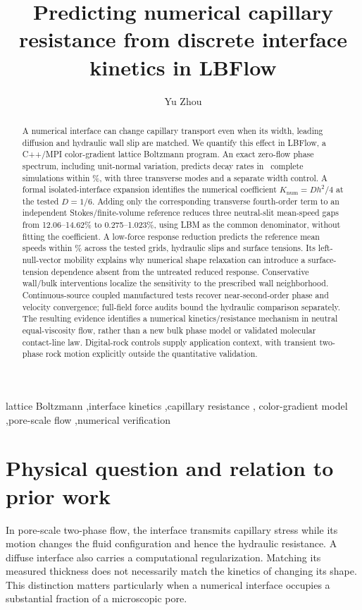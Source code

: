 \documentclass[preprint,12pt]{elsarticle}
\begin{document}
\begin{frontmatter}
\title{Predicting numerical capillary resistance from discrete interface kinetics in LBFlow}
\author{Yu Zhou}
\address{Independent Researcher, Canada}
\begin{abstract}
A numerical interface can change capillary transport even when its width,
leading diffusion and hydraulic wall slip are matched. We quantify this
effect in LBFlow, a C++/MPI color-gradient lattice Boltzmann program.
An exact zero-flow phase spectrum, including unit-normal variation, predicts
decay rates in \MajorWaveCount\ complete simulations within \MajorWavePercent\%,
with three transverse modes and a separate width control.
A formal isolated-interface expansion identifies the numerical coefficient
$K_{\mathrm{num}}=Dh^2/4$ at the tested $D=1/6$.
Adding only the corresponding transverse fourth-order term to an independent
Stokes/finite-volume reference reduces three neutral-slit mean-speed gaps
from 12.06--14.62\% to 0.275--1.023\%, using LBM as the common
denominator, without fitting the coefficient.
A low-force response reduction predicts the reference mean speeds within
\MajorReducedAllPercent\% across the tested grids, hydraulic slips and
surface tensions. Its left-null-vector mobility explains why numerical
shape relaxation can introduce a surface-tension dependence absent from
the untreated reduced response. Conservative wall/bulk interventions
localize the sensitivity to the prescribed wall neighborhood.
Continuous-source coupled manufactured tests recover near-second-order
phase and velocity convergence; full-field force audits bound the hydraulic
comparison separately. The resulting evidence identifies a numerical
kinetics/resistance mechanism in neutral equal-viscosity flow, rather than
a new bulk phase model or validated molecular contact-line law.
Digital-rock controls supply application context, with transient two-phase
rock motion explicitly outside the quantitative validation.
\end{abstract}
\begin{keyword}
lattice Boltzmann \sep interface kinetics \sep capillary resistance \sep
color-gradient model \sep pore-scale flow \sep numerical verification
\end{keyword}
\end{frontmatter}



\section{Physical question and relation to prior work}
In pore-scale two-phase flow, the interface transmits capillary stress while
its motion changes the fluid configuration and hence the hydraulic resistance.
A diffuse interface also carries a computational regularization. Matching
its measured thickness does not necessarily match the kinetics of changing
its shape. This distinction matters particularly when a numerical interface
occupies a substantial fraction of a microscopic pore.
\end{document}

